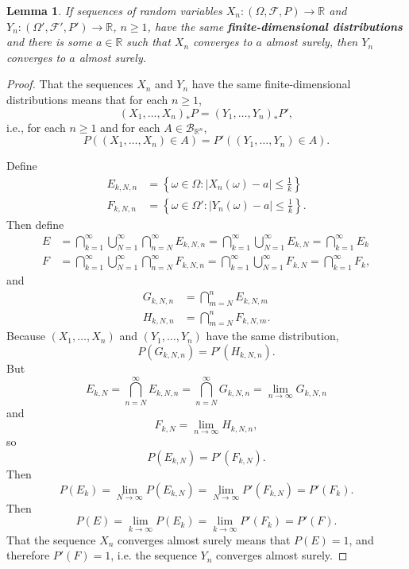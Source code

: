 \documentclass{article}
\newtheorem{lemma}[theorem]{Lemma}
\theoremstyle{definition}
\begin{document}
\begin{lemma}
If sequences of random variables $X_n:(\Omega,\mathscr{F},P) \to \mathbb{R}$ and $Y_n:(\Omega',\mathscr{F}',P') \to \mathbb{R}$, $n \geq 1$, have the same \textbf{finite-dimensional distributions} and there is some
$a \in \mathbb{R}$ such that
$X_n$ converges to $a$ almost surely, then $Y_n$ converges to $a$ almost surely.
\label{finitedimensional}
\end{lemma}
\begin{proof}
That the sequences $X_n$ and $Y_n$ have the same finite-dimensional distributions means that
for each $n \geq 1$,
\[
(X_1,\ldots,X_n)_*P = (Y_1,\ldots,Y_n)_*P',
\]
i.e., for each $n \geq 1$ and for each $A \in \mathscr{B}_{\mathbb{R}^n}$,
\[
P((X_1,\ldots,X_n) \in A) = P'((Y_1,\ldots,Y_n) \in A).
\]

Define
\begin{align*}
E_{k,N,n} &= \left\{ \omega \in \Omega: |X_n(\omega)-a| \leq \frac{1}{k} \right\}\\
F_{k,N,n} &= \left\{ \omega \in \Omega': |Y_n(\omega)-a| \leq \frac{1}{k} \right\}.
\end{align*}
Then define
\begin{align*}
E&=\bigcap_{k=1}^\infty \bigcup_{N=1}^\infty \bigcap_{n=N}^\infty E_{k,N,n}=
\bigcap_{k=1}^\infty \bigcup_{N=1}^\infty E_{k,N}
=\bigcap_{k=1}^\infty E_k
\\
F&=\bigcap_{k=1}^\infty \bigcup_{N=1}^\infty \bigcap_{n=N}^\infty F_{k,N,n}
=
\bigcap_{k=1}^\infty \bigcup_{N=1}^\infty F_{k,N}
=\bigcap_{k=1}^\infty F_k,
\end{align*}
and 
\begin{align*}
G_{k,N,n}&=\bigcap_{m=N}^n E_{k,N,m}\\
H_{k,N,n}&=\bigcap_{m=N}^n F_{k,N,m}.
\end{align*}
Because $(X_1,\ldots,X_n)$ and $(Y_1,\ldots,Y_n)$ have the same distribution,
\[
P(G_{k,N,n}) = P'(H_{k,N,n}).
\]
But
\[
E_{k,N} = \bigcap_{n=N}^\infty E_{k,N,n}
=\bigcap_{n=N}^\infty G_{k,N,n}
=\lim_{n \to \infty} G_{k,N,n} 
\]
and
\[
F_{k,N} = \lim_{n \to \infty} H_{k,N,n},
\]
so 
\[
P(E_{k,N}) = P'(F_{k,N}).
\]
Then 
\[
P(E_k) = \lim_{N \to \infty} P(E_{k,N}) =  \lim_{N \to \infty} P'(F_{k,N})=P'(F_k).
\]
Then
\[
P(E) = \lim_{k \to \infty} P(E_k) = \lim_{k \to \infty} P'(F_k) = P'(F).
\]
That the sequence $X_n$ converges almost surely means that $P(E)=1$, and therefore
$P'(F)=1$, i.e. the sequence $Y_n$  converges almost surely.
\end{proof}
\end{document}
